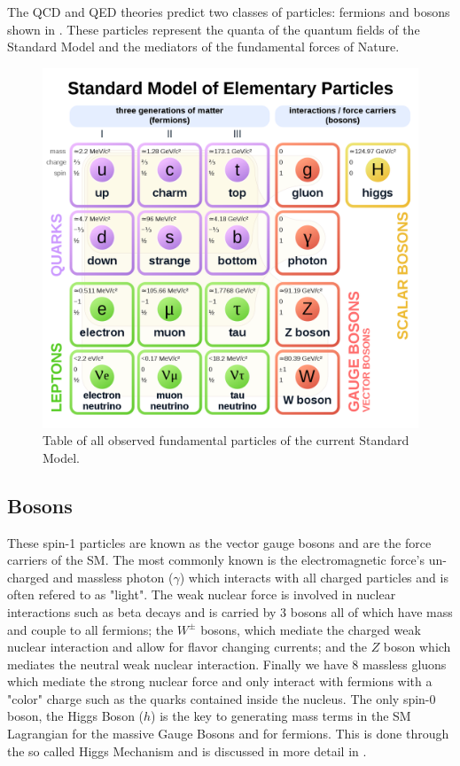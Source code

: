 The QCD and QED theories predict two classes of particles: fermions and bosons
shown in . These particles represent the quanta
of the quantum fields of the Standard Model and the mediators of the fundamental
forces of Nature.

\begin{figure}[!htbp]
  \begin{center}
    \includegraphics[width=0.8\linewidth]{figures/theory/standard_model.png}
    \caption{ Table of all observed fundamental particles of the current
Standard Model.}
    \label{fig:standard_model}
  \end{center}
\end{figure}

\subsection{Bosons} \label{sec:theory:bosons}

These spin-1 particles are known as the vector gauge bosons and are the
force carriers of the SM.  The most commonly known is the electromagnetic
force's un-charged and massless photon ($\gamma$) which interacts with all
charged particles and is often refered to as "light".  The weak nuclear force is
involved in nuclear interactions such as beta decays and is carried by 3 bosons
all of which have mass and couple to all fermions; the $W^{\pm}$ bosons, which
mediate the charged weak nuclear interaction and allow for flavor changing
currents; and the $Z$ boson which mediates the neutral weak nuclear interaction.
Finally we have 8 massless gluons which mediate the strong nuclear force and
only interact with fermions with a "color" charge such as the quarks contained
inside the nucleus. The only spin-0 boson, the Higgs Boson ($h$) is the key to
generating mass terms in the SM Lagrangian for the massive Gauge Bosons and for
fermions.  This is done through the so called Higgs Mechanism and is discussed
in more detail in .

